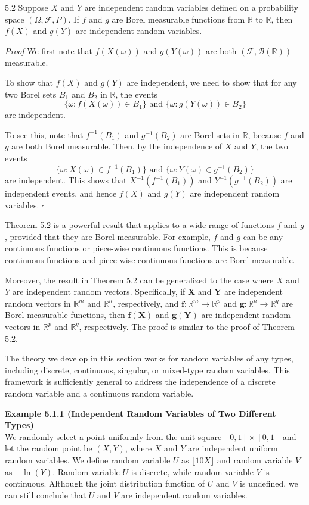 \begin{thmbox}{5.2}
Suppose $X$ and $Y$ are independent random variables defined on a probability space $(\Omega,\mathcal{F},P)$. If $f$ and $g$ are Borel measurable functions from $\mathbb{R}$ to $\mathbb{R}$, then $f(X)$ and $g(Y)$ are independent random variables.
\end{thmbox}

\textit{Proof} We first note that $f(X(\omega))$ and $g(Y(\omega))$ are both $(\mathcal{F},\mathcal{B}(\mathbb{R}))$-measurable.

To show that $f(X)$ and $g(Y)$ are independent, we need to show that for any two Borel sets $B_1$ and $B_2$ in $\mathbb{R}$, the events
\[
\{\omega : f(X(\omega)) \in B_1\} \text{ and } \{\omega : g(Y(\omega)) \in B_2\}
\]
are independent.

To see this, note that $f^{-1}(B_1)$ and $g^{-1}(B_2)$ are Borel sets in $\mathbb{R}$, because $f$ and $g$ are both Borel measurable. Then, by the independence of $X$ and $Y$, the two events
\[
\{\omega : X(\omega) \in f^{-1}(B_1)\} \text{ and } \{\omega : Y(\omega) \in g^{-1}(B_2)\}
\]
are independent. This shows that $X^{-1}(f^{-1}(B_1))$ and $Y^{-1}(g^{-1}(B_2))$ are independent events, and hence $f(X)$ and $g(Y)$ are independent random variables. \hfill $\square$

Theorem 5.2 is a powerful result that applies to a wide range of functions $f$ and $g$, provided that they are Borel measurable. For example, $f$ and $g$ can be any continuous functions or piece-wise continuous functions. This is because continuous functions and piece-wise continuous functions are Borel measurable.

Moreover, the result in Theorem 5.2 can be generalized to the case where $X$ and $Y$ are independent random vectors. Specifically, if $\mathbf{X}$ and $\mathbf{Y}$ are independent random vectors in $\mathbb{R}^m$ and $\mathbb{R}^n$, respectively, and $\mathbf{f} : \mathbb{R}^m \to \mathbb{R}^p$ and $\mathbf{g} : \mathbb{R}^n \to \mathbb{R}^q$ are Borel measurable functions, then $\mathbf{f}(\mathbf{X})$ and $\mathbf{g}(\mathbf{Y})$ are independent random vectors in $\mathbb{R}^p$ and $\mathbb{R}^q$, respectively. The proof is similar to the proof of Theorem 5.2.

The theory we develop in this section works for random variables of any types, including discrete, continuous, singular, or mixed-type random variables. This framework is sufficiently general to address the independence of a discrete random variable and a continuous random variable.

\textbf{Example 5.1.1 (Independent Random Variables of Two Different Types)} \\
We randomly select a point uniformly from the unit square $[0,1] \times [0,1]$ and let the random point be $(X,Y)$, where $X$ and $Y$ are independent uniform random variables. We define random variable $U$ as $\lfloor 10X \rfloor$ and random variable $V$ as $-\ln(Y)$. Random variable $U$ is discrete, while random variable $V$ is continuous. Although the joint distribution function of $U$ and $V$ is undefined, we can still conclude that $U$ and $V$ are independent random variables.
